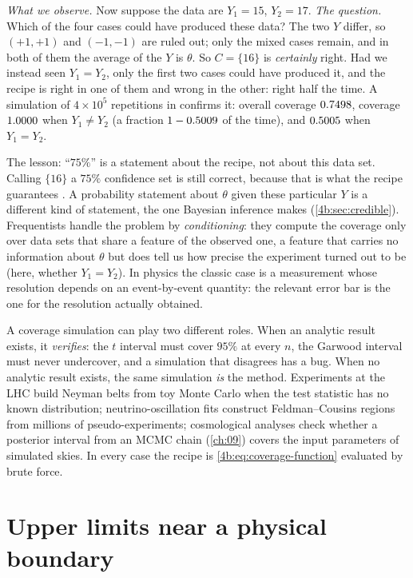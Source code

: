 \emph{What we observe.} Now suppose the data are $Y_1=15$, $Y_2=17$.
\emph{The question.} Which of the four cases could have produced these data?
The two $Y$ differ, so $(+1,+1)$ and $(-1,-1)$ are ruled out; only the mixed
cases remain, and in both of them the average of the $Y$ is $\theta$. So
$C=\{16\}$ is \emph{certainly} right. Had we instead seen $Y_1=Y_2$, only the
first two cases could have produced it, and the recipe is right in one of them
and wrong in the other: right half the time. A simulation of $4\times10^5$ repetitions in
 confirms it: overall coverage
$0.7498$, coverage $1.0000$ when $Y_1\ne Y_2$ (a fraction
$1-0.5009$ of the time), and $0.5005$ when $Y_1=Y_2$.

The lesson: ``$75\%$'' is a statement about the recipe, not about this data
set. Calling $\{16\}$ a $75\%$ confidence set is still correct, because that is
what the recipe guarantees . A probability statement about
$\theta$ given these particular $Y$ is a different kind of statement, the one
Bayesian inference makes (\cref{4b:sec:credible}). Frequentists handle the
problem by \emph{conditioning}: they compute the coverage only over data sets
that share a feature of the observed one, a feature that carries no information
about $\theta$ but does tell us how precise the experiment turned out to be
(here, whether $Y_1=Y_2$). In physics the classic case is a measurement whose
resolution depends on an event-by-event quantity: the relevant error bar is the
one for the resolution actually obtained.

\begin{inpractice}
A coverage simulation can play two different roles. When an analytic result
exists, it \emph{verifies}: the $t$ interval must cover $95\%$ at every $n$, the
Garwood interval must never undercover, and a simulation that disagrees has a
bug. When no analytic result exists, the same simulation \emph{is} the method.
Experiments at the LHC build Neyman belts from toy Monte Carlo when the test
statistic has no known distribution; neutrino-oscillation fits construct
Feldman--Cousins regions from millions of pseudo-experiments; cosmological
analyses check whether a posterior interval from an MCMC chain
(\cref{ch:09}) covers the input parameters of simulated skies. In every case the
recipe is \eqref{4b:eq:coverage-function} evaluated by brute force.
\end{inpractice}
\section{Upper limits near a physical boundary}
\label{4b:sec:boundary}

